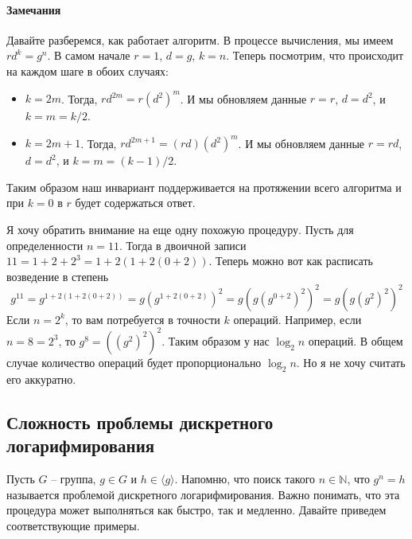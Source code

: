 \paragraph{Замечания}

Давайте разберемся, как работает алгоритм.
В процессе вычисления, мы имеем $r d^k = g^n$. В самом начале $r = 1$, $d = g$, $k = n$. Теперь посмотрим, что происходит на каждом шаге в обоих случаях:
\begin{itemize}
\item $k = 2m$. Тогда, $r d^{2m} = r (d^2)^m$. И мы обновляем данные $r = r$, $d = d^2$, и $k = m = k/2$.
\item $k = 2m +1$. Тогда, $r d^{2 m + 1} = (r d) (d^2)^m$. И мы обновляем данные $r = rd$, $d = d^2$, и $k = m = (k - 1) / 2$.
\end{itemize}
Таким образом наш инвариант поддерживается на протяжении всего алгоритма и при $k = 0$ в $r$ будет содержаться ответ.

Я хочу обратить внимание на еще одну похожую процедуру. Пусть для определенности $n = 11$. Тогда в двоичной записи $11 = 1 + 2 + 2^3 = 1 + 2 ( 1 + 2( 0 + 2 ))$. Теперь можно вот как расписать возведение в степень
\[
g^{11} = g^{1 + 2 ( 1 + 2( 0 + 2 ))} = g (g^{ 1 + 2( 0 + 2 )})^2 =  g (g (g^{ 0 + 2 })^2)^2 =   g (g (g^{ 2 })^2)^2
\]
Если $n = 2^k$, то вам потребуется в точности $k$ операций. Например, если $n = 8 = 2^3$, то $g^8 = ((g^2)^2)^2$. Таким образом у нас $\log_2 n$ операций. В общем случае количество операций будет пропорционально $\log_2 n$. Но я не хочу считать его аккуратно.

\subsection{Сложность проблемы дискретного логарифмирования}\label{section::DiscreteLog}

Пусть $G$ -- группа, $g\in G$ и $h \in \langle g\rangle$. Напомню, что поиск такого $n\in \mathbb N$, что $g^n = h$ называется проблемой дискретного логарифмирования. Важно понимать, что эта процедура может выполняться как быстро, так и медленно. Давайте приведем соответствующие примеры.

